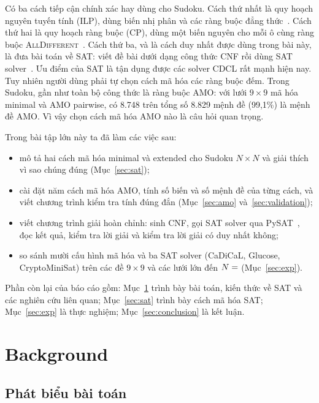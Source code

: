 \documentclass[a4paper,fleqn]{cas-sc}
\begin{document}
Có ba cách tiếp cận chính xác hay dùng cho Sudoku. Cách thứ nhất là quy hoạch nguyên tuyến tính (ILP), dùng biến nhị phân và các ràng buộc đẳng thức~\citep{bartlett2008}. Cách thứ hai là quy hoạch ràng buộc (CP), dùng một biến nguyên cho mỗi ô cùng ràng buộc \textsc{AllDifferent}~\citep{simonis2005}. Cách thứ ba, và là cách duy nhất được dùng trong bài này, là đưa bài toán về SAT: viết đề bài dưới dạng công thức CNF rồi dùng SAT solver~\citep{weber2005,lynce2006}. Ưu điểm của SAT là tận dụng được các solver CDCL rất mạnh hiện nay. Tuy nhiên người dùng phải tự chọn cách mã hóa các ràng buộc đếm. Trong Sudoku, gần như toàn bộ công thức là ràng buộc AMO: với lưới $9\times9$ mã hóa minimal và AMO pairwise, có 8.748 trên tổng số 8.829 mệnh đề (99,1\%) là mệnh đề AMO. Vì vậy chọn cách mã hóa AMO nào là câu hỏi quan trọng.

Trong bài tập lớn này ta đã làm các việc sau:
\begin{itemize}
\item mô tả hai cách mã hóa minimal và extended cho Sudoku $N\times N$ và giải thích vì sao chúng đúng (Mục~\ref{sec:sat});
\item cài đặt năm cách mã hóa AMO, tính số biến và số mệnh đề của từng cách, và viết chương trình kiểm tra tính đúng đắn (Mục~\ref{sec:amo} và~\ref{sec:validation});
\item viết chương trình giải hoàn chỉnh: sinh CNF, gọi SAT solver qua PySAT~\citep{ignatiev2018}, đọc kết quả, kiểm tra lời giải và kiểm tra lời giải có duy nhất không;
\item so sánh mười cấu hình mã hóa và ba SAT solver (CaDiCaL, Glucose, CryptoMiniSat) trên các đề $9\times9$ và các lưới lớn đến $N=$ (Mục~\ref{sec:exp}).
\end{itemize}

Phần còn lại của báo cáo gồm: Mục~\ref{sec:background} trình bày bài toán, kiến thức về SAT và các nghiên cứu liên quan; Mục~\ref{sec:sat} trình bày cách mã hóa SAT; Mục~\ref{sec:exp} là thực nghiệm; Mục~\ref{sec:conclusion} là kết luận.

\section{Background}\label{sec:background}

\subsection{Phát biểu bài toán}\label{sec:problem}
\end{document}
